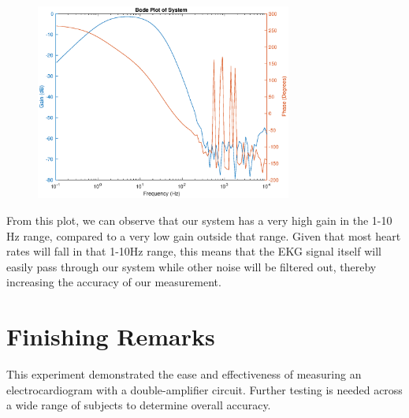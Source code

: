 \documentclass[11pt]{article}
\begin{document}
\begin{figure} [!ht]

	\centering  %
	
	\includegraphics[width=0.75\textwidth]{bode.eps}
	
	
	\caption{}
	
	\label{fig:bode}
\end{figure}

From this plot, we can observe that our system has a very high gain in the 1-10 Hz range, compared to a very low gain outside that range. Given that most heart rates will fall in that 1-10Hz range, this means that the EKG signal itself will easily pass through our system while other noise will be filtered out, thereby increasing the accuracy of our measurement.


\section{Finishing Remarks}
This experiment demonstrated the ease and effectiveness of measuring an electrocardiogram with a double-amplifier circuit. Further testing is needed across a wide range of subjects to determine overall accuracy.
\end{document}
